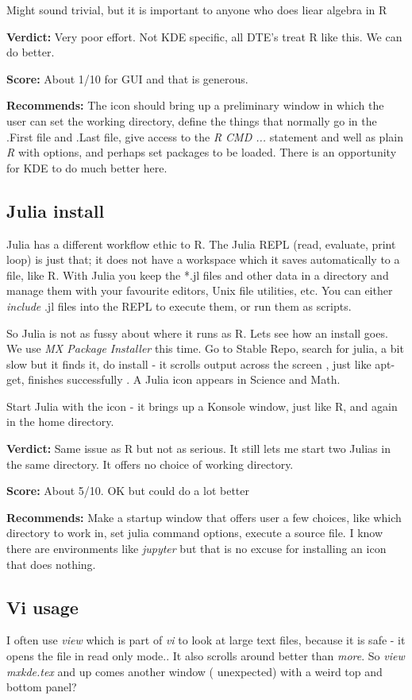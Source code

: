 \documentclass{article}  %
\begin{document}
Might sound trivial, but it is important to anyone who does liear algebra in R

 
{\bf Verdict:} Very poor effort. Not KDE specific, all DTE's treat R like this. We can do better.

{\bf Score:} About 1/10 for GUI  and that is generous.

{\bf Recommends:} The icon should bring up a preliminary window in which the user can set the working directory, define the things that normally go in the .First file and .Last file, give access to the {\em R CMD ...}  statement and well as plain {\em R} with options,  and perhaps set packages to be loaded. There is an opportunity for KDE to do much better here.


\subsection{Julia install}
Julia has a different workflow ethic to R. The Julia REPL (read, evaluate, print loop) is just that; it does not have a workspace which it saves automatically to a file, like R. With Julia you keep the *.jl files and other data in a directory and manage them with your favourite editors, Unix file utilities, etc. You can either {\em include} .jl files into the REPL to execute them, or run them as scripts. 

So Julia is not as fussy about where it runs as R. Lets see how an install goes. We use {\em MX Package Installer} this time. Go to Stable Repo, search for julia, a bit slow but it finds it, do install - it scrolls output across the screen , just like apt-get, finishes successfully .  A Julia icon appears in Science and Math. 
 
Start Julia with the icon - it brings up a Konsole window, just like R, and again in the home directory.

{\bf Verdict:} Same issue as R but not as serious.  It still lets me start two Julias in the same directory.  It offers no choice of working directory. 

{\bf Score:} About 5/10. OK but could do a lot better

{\bf Recommends:}  Make a startup window that offers user a few choices, like which directory to work in, set julia command options,  execute a source file. I know there are environments like {\em jupyter} but that is no excuse for installing an icon that does nothing.

\subsection{Vi usage}
I often use {\em view} which is part of {\em vi} to look at large text files, because it is safe - it opens the file in read only mode.. It also scrolls around better than {\em more}. So {\em view mxkde.tex} and up comes another window ( unexpected) with a weird top and bottom panel? 
\end{document}
